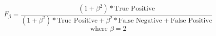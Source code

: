 \documentclass[]{article}
\begin{document}
\[F_{\beta} = \displaystyle\frac{(1+\beta^2)*\textrm{True Positive}}{(1+\beta^2)*\textrm{True Positive} + \beta^2*\textrm{False Negative} + \textrm{False Positive}}\]
\[\textrm{where $\beta = 2$}\]
\end{document}
